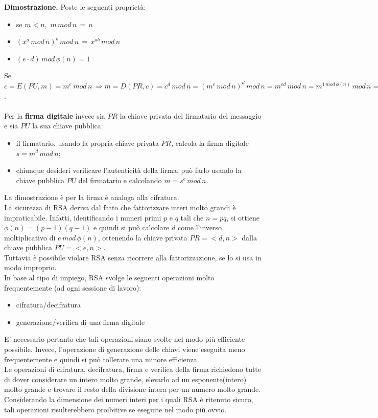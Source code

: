 \textbf{Dimostrazione.} Poste le seguenti proprietà: \begin{itemize}
\item se $m<n$, $ \, m \, mod \, n\,=\,n$
\item $(x^a \, mod \, n)^b \, mod \, n \, = \, x^{ab} \, mod \, n$
\item $(e \cdot d) \, mod \, \phi(n) = 1$
\end{itemize}
Se $c=E(PU,m) = m^e \, mod \, n \, \Rightarrow m=D(PR,c) = c^d \, mod \, n = (m^e \, mod \, n)^d \, mod \, n = m^{ed} \, mod \, n = m^{1 \, mod \, \phi(n)} \, mod \, n = m \, mod \, n = m$. \\ \\
Per la \textbf{firma digitale} invece sia $PR$ la chiave privata del firmatario del messaggio e sia $PU$ la sua chiave pubblica: \begin{itemize}
\item il firmatario, usando la propria chiave privata $PR$, calcola la firma digitale $s = m^d \, mod \, n$;
\item chiunque desideri verificare l'autenticità della firma, può farlo usando la chiave pubblica $PU$ del firmatario e calcolando $m = s^e \, mod \, n$.
\end{itemize}
La dimostrazione è per la firma è analoga alla cifratura. \\

La sicurezza di RSA deriva dal fatto che fattorizzare interi molto grandi è impraticabile. Infatti, identificando i numeri primi $p$ e $q$ tali che $n = pq$, si ottiene $\phi(n) = (p-1)(q-1)$ e quindi si può calcolare $d$ come l'inverso moltiplicativo di $e \, mod \, \phi(n)$, ottenendo la chiave privata $PR = <d,n>$ dalla chiave pubblica $PU = <e,n>$. \\ 
Tuttavia è possibile violare RSA senza ricorrere alla fattorizzazione, se lo si usa in modo improprio. \\
In base al tipo di impiego, RSA svolge le seguenti operazioni molto frequentemente (ad ogni sessione di lavoro): \begin{itemize}
\item cifratura/decifratura
\item generazione/verifica di una firma digitale
\end{itemize}
E' necessario pertanto che tali operazioni siano svolte nel modo più efficiente possibile. Invece, l'operazione di generazione delle chiavi viene eseguita meno frequentemente e quindi si può tollerare una minore efficienza.\\
Le operazioni di cifratura, decifratura, firma e verifica della firma richiedono tutte di dover considerare un intero molto grande, elevarlo ad un esponente(intero) molto grande e trovare il resto della divisione intera per un numero molto grande. Considerando la dimensione dei numeri interi per i quali RSA è ritenuto sicuro, tali operazioni
risulterebbero proibitive se eseguite nel modo più ovvio. \\
